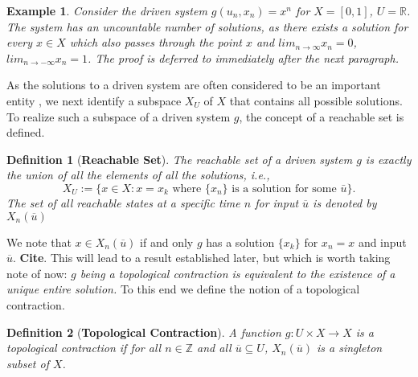 \documentclass[a4paper,12pt,twoside]{book}
\newtheorem{Definition}{Definition}[]
\newtheorem{Example}{Example}[]
\begin{document}
\begin{Example}\label{Ex_exp} \rm 
 Consider the driven system $g(u_n,x_n)=x^n$ for $X=[0,1]$, $U=\mathbb{R}$. The system has an uncountable number of solutions, as there exists a solution for every $x\in{X}$ which also passes through the point $x$ and $lim_{n\to\infty}x_n=0$, $lim_{n\to{-}\infty}x_n=1$. 
 The proof is deferred to immediately after the next paragraph. 
 
\end{Example}

As the solutions to a driven system are often considered to be an important entity \cite{M: edited the sentence here}, we next identify a subspace $X_U$ of $X$ that contains all possible solutions. To realize such a subspace of a driven system $g$, the concept of a reachable set is defined.

\begin{Definition}
  [\bf Reachable Set]\label{Dfn_ReachableSet}
The reachable set of a driven system $g$ is exactly the union of all the elements of all the solutions, i.e., 
\[X_U :=\Big \{x \in X:  x = x_k \mbox{ where  $\{x_n\}$  is a solution for some  $\bar{u}$} \Big \}.\]
The set of all reachable states at a specific time $n$ for input $\overline{u}$ is denoted by $X_n(\overline{u})$
\end{Definition}

We note that $x\in{X_n(\overline{u})}$ if and only $g$ has a solution $\{x_k\}$ for $x_n=x$ and input $\overline{u}$. \textbf{Cite}.
This will lead to a result established later, but which is worth taking note of now: \textit{$g$ being a topological contraction is equivalent to the existence of a unique entire solution.} To this end we define the notion of a topological contraction. 
 

\begin{Definition}
  [\bf Topological Contraction]\label{Dfn_TopContr}
  A function $g:U\times{X}\to{X}$ is a topological contraction if for all $n\in\mathbb{Z}$ and all $\overline{u}\subseteq{U}$, $X_n(\overline{u})$ is a singleton subset of $X$.  
\end{Definition}
\end{document}
